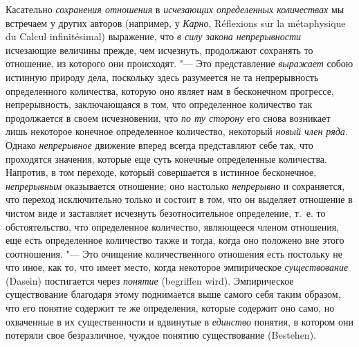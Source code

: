Касательно {\em сохранения отношения} в
{\em исчезающих определенных количествах} мы встречаем
у других авторов (например, у {\em Карно},
Réflexions sur la métaphysique du Calcul infinitésimal)
выражение, что {\em в силу закона непрерывности}
исчезающие величины прежде, чем исчезнуть, продолжают
сохранять то отношение, из которого они происходят. "--- Это представление
{\em выражает} собою истинную природу дела, поскольку
здесь разумеется не та непрерывность определенного количества, которую оно
являет нам в бесконечном прогрессе, непрерывность, заключающаяся в том, что
определенное количество так продолжается в своем исчезновении, что
{\em по ту сторону} его снова возникает лишь некоторое
конечное определенное количество, некоторый {\em новый
член ряда}. Однако {\em непрерывное} движение вперед
всегда представляют себе так, что проходятся значения, которые еще суть
конечные определенные количества. Напротив, в том переходе, который
совершается в истинное бесконечное, {\em непрерывным}
оказывается отношение; оно настолько {\em непрерывно} и
сохраняется, что переход исключительно только и состоит в том, что он
выделяет отношение в чистом виде и заставляет исчезнуть безотносительное
определение, т.~е. то обстоятельство, что определенное количество,
являющееся членом отношения, еще есть определенное количество также и
тогда, когда оно положено вне этого соотношения. "--- Это очищение
количественного отношения есть постольку не что иное, как то, что имеет
место, когда некоторое эмпирическое {\em существование}
(Dasein) постигается через {\em понятие} (begriffen
wird). Эмпирическое существование благодаря этому поднимается выше самого
себя таким образом, что его понятие содержит те же определения, которые
содержит оно само, но охваченные в их существенности и вдвинутые в
{\em единство} понятия, в котором они потеряли свое
безразличное, чуждое понятию существование (Bestehen).

